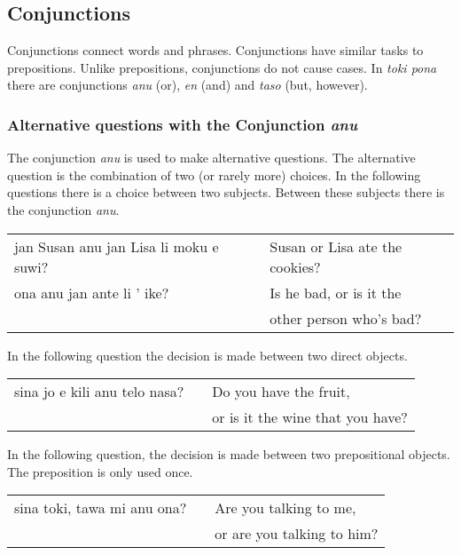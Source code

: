 \subsection*{Conjunctions}
%
%
Conjunctions connect words and phrases. 
Conjunctions have similar tasks to prepositions.
Unlike prepositions, conjunctions do not cause cases.
In \textit{toki pona} there are conjunctions \textit{anu} (or),  \textit{en} (and) and \textit{taso} (but, however).

%
\subsubsection*{Alternative questions with the Conjunction \textit{anu}}
%
%
The conjunction \textit{anu} is used to make alternative questions. 
The alternative question is the combination of two (or rarely more) choices. 
In the following questions there is a choice between two subjects. 
Between these subjects there is the conjunction \textit{anu}. 

\begin{supertabular}{p{5,5cm}|ll}
jan Susan anu jan Lisa li moku e suwi?  && Susan or Lisa ate the cookies? \\
ona anu jan ante li ' ike? && Is he bad, or is it the \\ && other person who's bad? \\
\end{supertabular} 

In the following question the decision is made between two direct objects. 

\begin{supertabular}{p{5,5cm}|ll}
sina jo e kili anu telo nasa? && Do you have the fruit, \\ && or is it the wine that you have? \\
\end{supertabular} 

In the following question, the decision is made between two prepositional objects. 
The preposition is only used once. 

\begin{supertabular}{p{5,5cm}|ll}
sina toki, tawa mi anu ona? && Are you talking to me, \\ && or are you talking to him? \\
\end{supertabular} 

